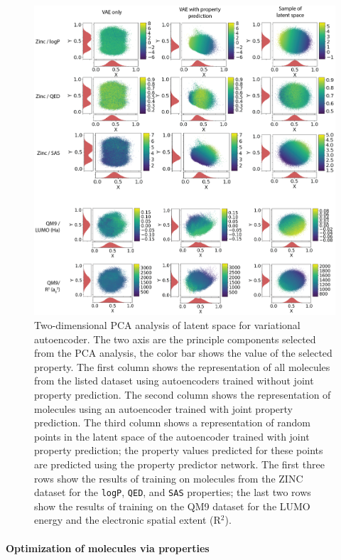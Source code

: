 \begin{figure}
    \centering
     \includegraphics[width=\textwidth]{fig3_ls_pictures_alpha.png}
    \caption[PCA analysis of Latent Space by Property]{Two-dimensional PCA analysis of latent space for variational autoencoder. The two axis are the principle components selected from the PCA analysis, the color bar shows the value of the selected property. The first column shows the representation of all molecules from the listed dataset using autoencoders trained without joint property prediction. The second column shows the representation of molecules using an autoencoder trained with joint property prediction. The third column shows a representation of random points in the latent space of the autoencoder trained with joint property prediction; the property values predicted for these points are predicted using the property predictor network. The first three rows show the results of training on molecules from the ZINC dataset for the \texttt{logP}, \texttt{QED}, and \texttt{SAS} properties; the last two rows show the results of training on the QM9 dataset for the LUMO energy and the electronic spatial extent (R$^2$). } \label{fig:ls_figures}
\end{figure}



\paragraph{Optimization of molecules via properties}

